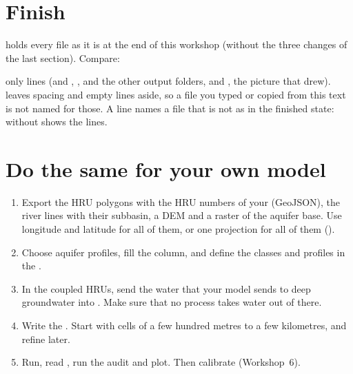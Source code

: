 \section{Finish}

 holds every file as it is at the end of this workshop (without the three changes of the last
section). Compare:
\see only lines  (and ,
,  and the other output folders, and , the picture that
 drew).  leaves spacing and empty lines aside, so a
file you typed or copied from this text is not named for those. A line  names a file that is
not as in the finished state:  without  shows the lines.

\section{Do the same for your own model}
\begin{enumerate}
\item Export the HRU polygons with the HRU numbers of your  (GeoJSON), the river lines with their subbasin, a
  DEM and a raster of the aquifer base. Use longitude and latitude for all of them, or one projection for all of them
  ().
\item Choose aquifer profiles, fill the  column, and define the classes and profiles in the
  .
\item In the coupled HRUs, send the water that your model sends to deep groundwater into . Make sure that
  no process takes water out of  there.
\item Write the . Start with cells of a few hundred metres to a few kilometres, and refine later.
\item Run, read , run the audit and plot. Then calibrate (Workshop~6).
\end{enumerate}
